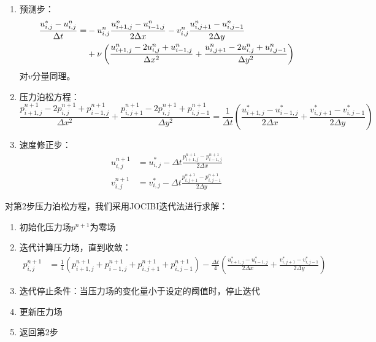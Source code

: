 \documentclass[12pt,a4paper]{article}
\begin{document}
\begin{enumerate}
    \item 预测步：
    \begin{align}
        \frac{u^*_{i,j} - u^n_{i,j}}{\Delta t} = 
        &- u^n_{i,j} \frac{u^n_{i+1,j} - u^n_{i-1,j}}{2\Delta x}
        - v^n_{i,j} \frac{u^n_{i,j+1} - u^n_{i,j-1}}{2\Delta y} \notag \\
        &+ \nu \left(
            \frac{u^n_{i+1,j} - 2u^n_{i,j} + u^n_{i-1,j}}{\Delta x^2}
            + \frac{u^n_{i,j+1} - 2u^n_{i,j} + u^n_{i,j-1}}{\Delta y^2}
        \right)
    \end{align}
    对$v$分量同理。

    \item 压力泊松方程：
    \begin{equation}
        \frac{p^{n+1}_{i+1,j} - 2p^{n+1}_{i,j} + p^{n+1}_{i-1,j}}{\Delta x^2}
        + \frac{p^{n+1}_{i,j+1} - 2p^{n+1}_{i,j} + p^{n+1}_{i,j-1}}{\Delta y^2}
        = \frac{1}{\Delta t} \left(
            \frac{u^*_{i+1,j} - u^*_{i-1,j}}{2\Delta x}
            + \frac{v^*_{i,j+1} - v^*_{i,j-1}}{2\Delta y}
        \right)
    \end{equation}

    \item 速度修正步：
    \begin{align}
        u^{n+1}_{i,j} &= u^*_{i,j} - \Delta t \frac{p^{n+1}_{i+1,j} - p^{n+1}_{i-1,j}}{2\Delta x} \\
        v^{n+1}_{i,j} &= v^*_{i,j} - \Delta t \frac{p^{n+1}_{i,j+1} - p^{n+1}_{i,j-1}}{2\Delta y}
    \end{align}
\end{enumerate}

对第2步压力泊松方程，我们采用JOCIBI迭代法进行求解：
\begin{enumerate}
    \item 初始化压力场$p^{n+1}$为零场
    \item 迭代计算压力场，直到收敛：
    \begin{align}
        p^{n+1}_{i,j} &= \frac{1}{4} \left(
            p^{n+1}_{i+1,j} + p^{n+1}_{i-1,j} + p^{n+1}_{i,j+1} + p^{n+1}_{i,j-1}
        \right) - \frac{\Delta t}{4} \left(
            \frac{u^*_{i+1,j} - u^*_{i-1,j}}{2\Delta x}
            + \frac{v^*_{i,j+1} - v^*_{i,j-1}}{2\Delta y}
        \right)
    \end{align}
    \item 迭代停止条件：当压力场的变化量小于设定的阈值时，停止迭代
    \item 更新压力场
    \item 返回第2步
\end{enumerate}
\end{document}
